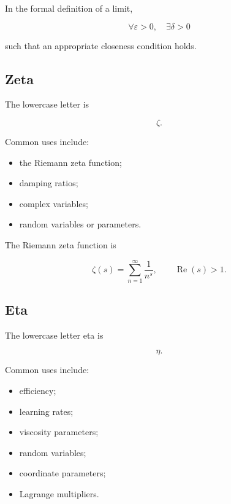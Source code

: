 In the formal definition of a limit,

\[
\boxed{
\forall\varepsilon>0,
\quad
\exists\delta>0
}
\]

such that an appropriate closeness condition holds.

\subsection{Zeta}
\label{subsec:greek-zeta}

The lowercase letter is

\[
\boxed{
\zeta.
}
\]

Common uses include:

\begin{itemize}
    \item the Riemann zeta function;
    \item damping ratios;
    \item complex variables;
    \item random variables or parameters.
\end{itemize}

The Riemann zeta function is

\[
\boxed{
\zeta(s)
=
\sum_{n=1}^{\infty}
\frac{1}{n^s},
\qquad
\operatorname{Re}(s)>1.
}
\]

\subsection{Eta}
\label{subsec:greek-eta}

The lowercase letter eta is

\[
\boxed{
\eta.
}
\]

Common uses include:

\begin{itemize}
    \item efficiency;
    \item learning rates;
    \item viscosity parameters;
    \item random variables;
    \item coordinate parameters;
    \item Lagrange multipliers.
\end{itemize}

